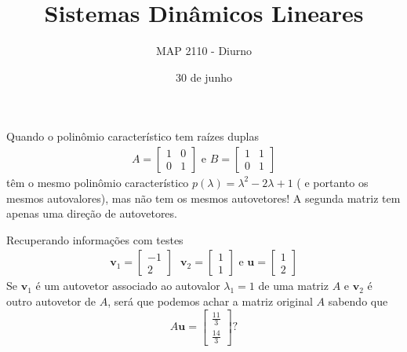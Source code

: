 \documentclass{beamer}
\title[diagonalização]{Sistemas Dinâmicos Lineares}
\author{MAP 2110 - Diurno}
\institute{IME USP}
\date{30 de junho}
\begin{document}
\begin{frame}
  \titlepage
\end{frame}
\begin{frame}{Quando o polinômio característico tem raízes duplas}
  \begin{gather*}
    A= \begin{bmatrix}
      1 & 0 \\ 0 & 1
    \end{bmatrix} \text{ e } B= \begin{bmatrix}
      1 & 1 \\ 0 & 1 
    \end{bmatrix}
  \end{gather*}
  têm o mesmo polinômio característico $p(\lambda) = \lambda^2 -2\lambda +1$ ( e portanto os mesmos autovalores), mas não tem os mesmos autovetores!
  A segunda matriz tem apenas uma direção de autovetores.
\end{frame}

\begin{frame}{Recuperando informações com testes}
  \begin{gather*}
    \mathbf{v}_1 = \begin{bmatrix}
      -1 \\ 2
    \end{bmatrix}\text{ }\mathbf{v}_2 = \begin{bmatrix}
      1 \\ 1
    \end{bmatrix} \text{ e } \mathbf{u}=\begin{bmatrix}
      1 \\ 2
    \end{bmatrix}
  \end{gather*}
  Se $\mathbf{v}_1$ é um autovetor associado ao autovalor $\lambda_1=1$ de uma matriz $A$ e $\mathbf{v}_2$ é outro
  autovetor de $A$, será que podemos achar a matriz original $A$ sabendo que 
  $$ A\mathbf{u}=\begin{bmatrix} \frac{11}{3}\\
    \frac{14}{3}
    \end{bmatrix} ?$$
\end{frame}
\end{document}
